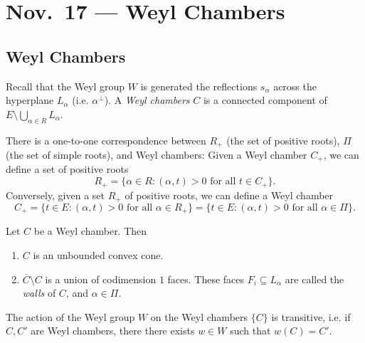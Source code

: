 \chapter{Nov.~17 --- Weyl Chambers}

\section{Weyl Chambers}

\begin{definition}
  Recall that the Weyl group $W$
  is generated the reflections
  $s_\alpha$ across the
  hyperplane $L_\alpha$
  (i.e. $\alpha^\perp$). A
  \emph{Weyl chambers} $C$ is a
  connected component of
  $E \setminus \bigcup_{\alpha \in R} L_\alpha$.
\end{definition}

\begin{remark}
  There is a one-to-one
  correspondence between
  $R_+$ (the set of positive roots),
  $\Pi$ (the set of simple roots),
  and Weyl chambers: Given a
  Weyl chamber $C_+$, we can define
  a set of positive roots
  \[
    R_+ = \{
      \alpha \in R : (\alpha, t) > 0
      \text{ for all } t \in C_+
    \}.
  \]
  Conversely, given a
  set $R_+$ of positive roots,
  we can define a Weyl chamber
  \[
    C_+ =
    \{
      t \in E : (\alpha, t) > 0
      \text{ for all } \alpha \in R_+
    \}
    = \{
      t \in E : (\alpha, t) > 0
      \text{ for all } \alpha \in \Pi
    \}.
  \]
\end{remark}

\begin{prop}
  Let $C$ be a Weyl chamber. Then
  \begin{enumerate}
    \item $C$ is an unbounded
      convex cone.
    \item $\overline{C} \setminus C$
      is a union of codimension
      $1$ faces. These faces
      $F_i \subseteq L_\alpha$
      are called the
      \emph{walls} of $C$, and
      $\alpha \in \Pi$.
  \end{enumerate}
\end{prop}

\begin{theorem}
  The action of the Weyl group
  $W$ on the Weyl chambers $\{C\}$
  is transitive, i.e. if
  $C, C'$ are Weyl chambers, there
  there exists $w \in W$ such that
  $w(C) = C'$.
\end{theorem}

